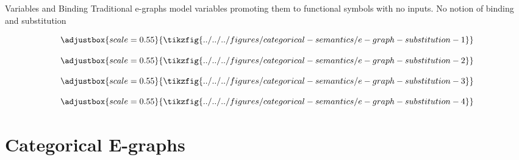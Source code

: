 \documentclass[aspectratio=169]{beamer}
\begin{document}
\begin{frame}{Variables and Binding}
Traditional e-graphs model variables promoting them to functional symbols with no inputs. No notion of binding and substitution
\vfill
\begin{example}
\vfill
\begin{minipage}{0.1\linewidth}
    \[
   \adjustbox{scale=0.55}{\tikzfig{../../../figures/categorical-semantics/e-graph-substitution-1}} 
    \]
\end{minipage}
\hspace{1em}
\begin{minipage}{0.2\linewidth}
    \[
   \adjustbox{scale=0.55}{\tikzfig{../../../figures/categorical-semantics/e-graph-substitution-2}} 
    \]
\end{minipage}
\hspace{2em}
\begin{minipage}{0.25\linewidth}
    \[
   \adjustbox{scale=0.55}{\tikzfig{../../../figures/categorical-semantics/e-graph-substitution-3}} 
    \]
\end{minipage}
\hspace{2em}
\begin{minipage}{0.25\linewidth}
    \[
   \adjustbox{scale=0.55}{\tikzfig{../../../figures/categorical-semantics/e-graph-substitution-4}} 
    \]
\end{minipage}
\end{example}
\end{frame}

\section{Categorical E-graphs}
\end{document}
